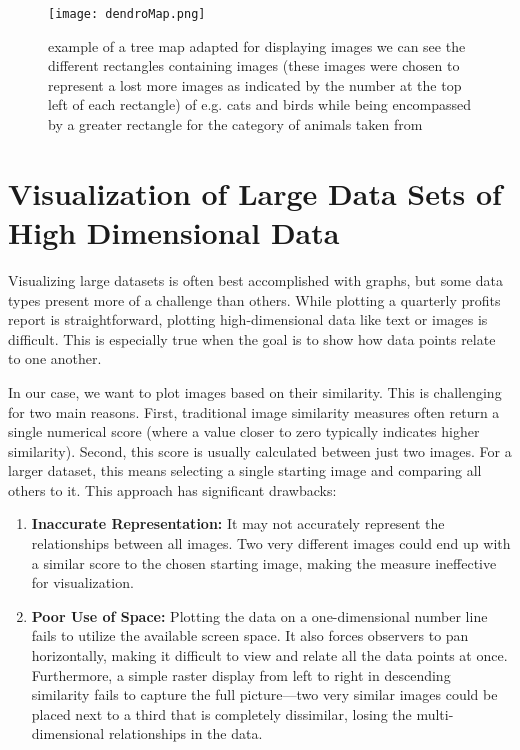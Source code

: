 \documentclass[
  a4paper,  %
  twoside,  %
  bibliography=totoc,
  headsepline,
  cleardoublepage=empty,
  parskip=half,
  draft=false
]{scrbook}
\begin{document}
  \begin{figure}[H]
	\centering
	\texttt{[image: dendroMap.png]}
	\caption{example of a tree map adapted for displaying images we can see the different rectangles containing images (these images were chosen to represent a lost more images as indicated by the number at the top left of each rectangle) of e.g. cats and birds while being encompassed by a greater rectangle for the category of animals taken from \cite{wordclouds}}
	\label{fig:dendroMap}
\end{figure}




\section{Visualization of Large Data Sets of High Dimensional Data}
\label{sec:HighData}
Visualizing large datasets is often best accomplished with graphs, but some data types present more of a challenge than others. While plotting a quarterly profits report is straightforward, plotting high-dimensional data like text or images is difficult. This is especially true when the goal is to show how data points relate to one another.

In our case, we want to plot images based on their similarity. This is challenging for two main reasons. First, traditional image similarity measures often return a single numerical score (where a value closer to zero typically indicates higher similarity). Second, this score is usually calculated between just two images. For a larger dataset, this means selecting a single starting image and comparing all others to it. This approach has significant drawbacks:

\begin{enumerate}
	\item \textbf{Inaccurate Representation:} It may not accurately represent the relationships between all images. Two very different images could end up with a similar score to the chosen starting image, making the measure ineffective for visualization.
	
	\item \textbf{Poor Use of Space:} Plotting the data on a one-dimensional number line fails to utilize the available screen space. It also forces observers to pan horizontally, making it difficult to view and relate all the data points at once. Furthermore, a simple raster display from left to right in descending similarity fails to capture the full picture---two very similar images could be placed next to a third that is completely dissimilar, losing the multi-dimensional relationships in the data.
\end{enumerate}
\end{document}

